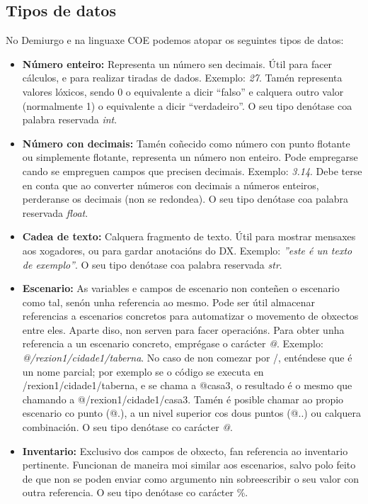 \subsection{Tipos de datos}
No Demiurgo e na linguaxe COE podemos atopar os seguintes tipos de datos:
\begin{itemize}
  \item {\bf Número enteiro:} Representa un número sen decimais. Útil para facer
  cálculos, e para realizar tiradas de dados. Exemplo: {\it 27}. Tamén
  representa valores lóxicos, sendo 0 o equivalente a dicir ``falso'' e calquera
  outro valor (normalmente 1) o equivalente a dicir ``verdadeiro''. O seu tipo
  denótase coa palabra reservada {\it int}.
  \item {\bf Número con decimais:} Tamén coñecido como número con punto
  flotante ou simplemente flotante, representa un número non enteiro. Pode
  empregarse cando se empreguen campos que precisen decimais. Exemplo: {\it
  3.14}. Debe terse en conta que ao converter números con decimais a números
  enteiros, perderanse os decimais (non se redondea). O seu tipo
  denótase coa palabra reservada {\it float}.
  \item {\bf Cadea de texto:} Calquera fragmento de texto. Útil para mostrar
  mensaxes aos xogadores, ou para gardar anotacións do DX. Exemplo: {\it ''este
  é un texto de exemplo''}. O seu tipo
  denótase coa palabra reservada {\it str}.
  \item {\bf Escenario:} As variables e campos de escenario non conteñen o
  escenario como tal, senón unha referencia ao mesmo. Pode ser útil almacenar
  referencias a escenarios concretos para automatizar o movemento de obxectos
  entre eles. Aparte diso, non serven para facer operacións. Para obter
  unha referencia a un escenario concreto, emprégase o carácter {\it @}.
  Exemplo: {\it @/rexion1/cidade1/taberna}. No caso de non comezar por /,
  enténdese que é un nome parcial; por exemplo se o código se executa en
  /rexion1/cidade1/taberna, e se chama a @casa3, o resultado é o mesmo que
  chamando a @/rexion1/cidade1/casa3. Tamén é posible chamar ao propio
  escenario co punto (@.), a un nivel superior cos dous puntos (@..) ou calquera
  combinación.
  O seu tipo denótase co carácter {\it @}.
  \item {\bf Inventario:} Exclusivo dos campos de obxecto, fan referencia ao
  inventario pertinente. Funcionan de maneira moi similar aos escenarios, salvo
  polo feito de que non se poden enviar como argumento nin sobreescribir o seu
  valor con outra referencia. O seu tipo denótase co carácter \%.

\end{itemize}
